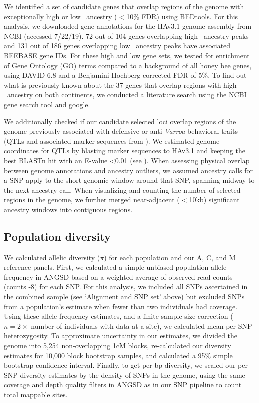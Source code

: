 We identified a set of candidate genes that overlap regions of the genome with exceptionally high or low \A\ ancestry ($<$10\% FDR) using BEDtools. For this analysis, we downloaded gene annotations for the HAv3.1 genome assembly from NCBI (accessed 7/22/19). 72 out of 104 genes overlapping high \A\ ancestry peaks and 131 out of 186 genes overlapping low \A\ ancestry peaks have associated BEEBASE gene IDs. For these high and low gene sets, we tested for enrichment of Gene Ontology (GO) terms compared to a background of all honey bee genes, using DAVID 6.8 \cite{Huang:2009gk} and a Benjamini-Hochberg corrected FDR of 5\%. To find out what is previously known about the 37 genes that overlap regions with high \A\  ancestry on both continents, we conducted a literature search using the NCBI gene search tool and google.

We additionally checked if our candidate selected loci overlap regions of the genome previously associated with defensive or anti-\textit{Varroa} behavioral traits (QTLs and associated marker sequences from \cite{ArechavaletaVelasco:2012cm,Oxley:2010dw,Tsuruda:2012fa,Spotter:2012dx,Hunt:1998th,Hunt:2007im,ArechavaletaVelasco:2003io,Solignac:2007dh,Harpur:HuntMarkers}). We estimated genome coordinates for QTLs by blasting marker sequences to HAv3.1 and keeping the best BLASTn \cite{Altschul:1990dw} hit with an E-value \textless 0.01 (see ). When assessing physical overlap between genome annotations and ancestry outliers, we assumed ancestry calls for a SNP apply to the short genomic window around that SNP, spanning midway to the next ancestry call. When visualizing and counting the number of selected regions in the genome, we further merged near-adjacent ($<$10kb) significant ancestry windows into contiguous regions.

\subsection*{Population diversity}
We calculated allelic diversity ($\pi$) for each population and our A, C, and M reference panels. First, we calculated a simple unbiased population allele frequency in ANGSD based on a weighted average of observed read counts (counts -8) for each SNP. For this analysis, we included all SNPs ascertained in the combined sample (see ‘Alignment and SNP set' above) but excluded SNPs from a population's estimate when fewer than two individuals had coverage. Using these allele frequency estimates, and a finite-sample size correction ($ n = 2 \times$ number of individuals with data at a site), we calculated mean per-SNP heterozygosity. To approximate uncertainty in our estimates, we divided the genome into 5,254 non-overlapping 1cM blocks, re-calculated our diversity estimates for 10,000 block bootstrap samples, and calculated a 95\% simple bootstrap confidence interval. Finally, to get per-bp diversity, we scaled our per-SNP diversity estimates by the density of SNPs in the genome, using the same coverage and depth quality filters in ANGSD as in our SNP pipeline to count total mappable sites.

